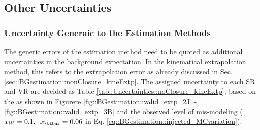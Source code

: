 \clearpage
\subsection{Other Uncertainties} 
\subsubsection{Uncertainty Generaic to the Estimation Methods}  \label{sec::Uncertainties::nonClosure}
The generic errors of the estimation method need to be quoted as additional uncertainties in the background expectation. 
In the kinematical extrapolation method, this refers to the extrapolation error as already discussed in Sec. \ref{sec::BGestimation::nonClosure_kineExtp}. 
The assigned uncertainty to each SR and VR are decided as Table \ref{tab::Uncertainties::noClosure_kineExtp}, based on the 
as shown in Figurere \ref{fig::BGestimation::valid_extp_2J} - \ref{fig::BGestimation::valid_extp_3B} and the observed level of mis-modeling ($x_W=0.1, \,\,\, x_{\ttbar}=0.06$ in Eq. \ref{eq::BGestimation::injected_MCvariation}).


